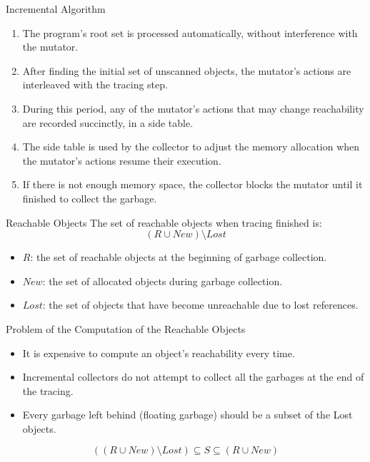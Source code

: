 \begin{bibunit}[apalike]
\begin{frame}{Incremental Algorithm}
	\begin{enumerate}
	\item The program's root set is processed automatically, without interference with the mutator.
	\vfill
	\item After finding the initial set of unscanned objects, the mutator's actions are interleaved with the tracing step.
	\vfill
	\item During this period, any of the mutator's actions that may change reachability are recorded succinctly, in a side table.
	\vfill
	\item The side table is used by the collector to adjust the memory allocation when the mutator's actions resume their execution.
	\vfill
	\item If there is not enough memory space, the collector blocks the mutator until it finished to collect the garbage.
	\end{enumerate}
\end{frame}

\begin{frame}{Reachable Objects}
	The set of reachable objects when tracing finished is:
		\[ \left( R \cup New \right) \setminus Lost \]
	\vfill
	\begin{itemize}
	\item $R$: the set of reachable objects at the beginning of garbage collection.
	\item $New$: the set of allocated objects during garbage collection.
	\item $Lost$:  the set of objects that have become unreachable due to lost references.
	\end{itemize}
\end{frame}

\begin{frame}{Problem of the Computation of the Reachable Objects}
	\begin{itemize}
	\item \alert{It is expensive to compute an object's reachability every time.}
	\vfill
	\item Incremental collectors do not attempt to collect all the garbages at the end of the tracing.
	\item Every garbage left behind (floating garbage) should be a subset of the Lost objects.
	\end{itemize}
	\vfill
		\[ \left( \left( R \cup New \right) \setminus Lost \right) \subseteq S \subseteq \left( R \cup New \right) \]
\end{frame}


\end{bibunit}
